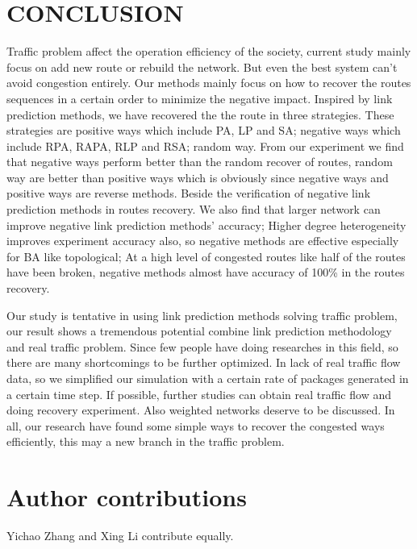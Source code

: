 \documentclass[onecolumn,preprintnumbers,amsmath,amssymb]{revtex4}
\begin{document}
\section*{CONCLUSION}
Traffic  problem affect the operation efficiency of the society, current study mainly focus on add new route or rebuild the network. But even the best system can't avoid congestion  entirely. Our methods mainly focus on how to recover the routes sequences in a certain order to minimize the negative impact. Inspired by link prediction methods, we have recovered the the route in three strategies. These strategies are positive ways which include PA, LP and SA; negative ways which include RPA, RAPA, RLP and RSA; random way. From our experiment we find that negative ways perform better than the random recover of routes, random way are better than positive ways which is obviously since negative ways and positive ways are reverse methods. Beside the verification of negative link prediction methods in routes recovery. We also find that larger network can improve negative link prediction methods' accuracy; Higher degree heterogeneity improves experiment accuracy also, so negative methods are effective especially for BA like topological; At a high level of congested routes like half of the routes have been broken, negative methods almost have accuracy of 100\% in the routes recovery.

Our study is tentative in using link prediction methods solving traffic problem, our result shows a tremendous potential combine link prediction methodology and real traffic problem. Since few people have doing researches in this field, so there are many shortcomings to be further optimized. In lack of real traffic flow data, so we simplified our simulation with a certain rate of packages generated in a certain time step. If possible, further studies can obtain real traffic flow and doing recovery experiment. Also weighted networks deserve to be discussed. In all, our research have found some simple ways to recover the congested ways efficiently, this may a new branch in the traffic problem.

\section*{Author contributions}
Yichao Zhang and Xing Li contribute equally.
\end{document}
